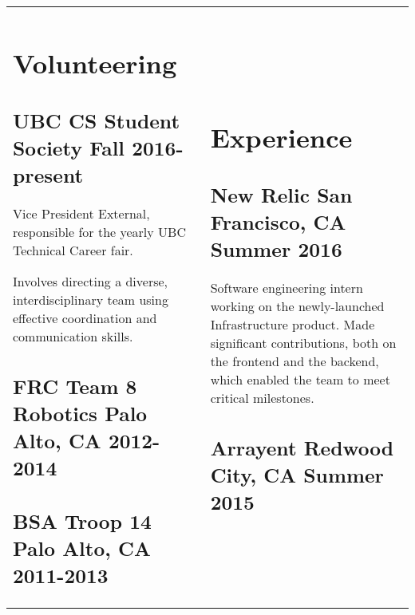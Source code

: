\documentclass[letterpaper]{article}
\newlength{\leftcol}
\newlength{\rightcol}
\newcommand{\subtitle}{\normalfont\sffamily\color{black}\large}
\begin{document}
\begin{tabularx}{\textwidth}{@{}p{\leftcol} p{\rightcol}}
\section*{Volunteering}

\subsection*{UBC CS Student Society \newline\subtitle Fall 2016-present}

Vice President External, responsible for the yearly UBC Technical Career fair.

\vspace*{.5\baselineskip}

Involves directing a diverse, interdisciplinary team using effective
coordination and communication skills.

\subsection*{FRC Team 8 Robotics \newline\subtitle Palo Alto, CA 2012-2014}

\subsection*{BSA Troop 14 \newline\subtitle Palo Alto, CA 2011-2013}

&

\vspace*{2pt}

\section*{Experience}


\subsection*{New Relic \subtitle San Francisco, CA Summer 2016}

Software engineering intern working on the newly-launched Infrastructure
product. Made significant contributions, both on the frontend and the backend,
which enabled the team to meet critical milestones.

\subsection*{Arrayent \subtitle Redwood City, CA Summer 2015}


\end{tabularx}
\end{document}
